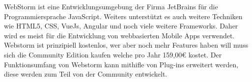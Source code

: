 WebStorm ist eine Entwicklungsumgebung der Firma JetBrains für die Programmiersprache JavaScript. Weiters unterstützt es auch weitere Techniken wie HTML5, CSS, VueJs, Angular und noch viele weitere Frameworks. Daher wird es meist für die Entwicklung von webbasierten Mobile Apps verwendet.
Webstorm ist prinzipiell kostenlos, wer aber noch mehr Features haben will muss sich die Community Edition kaufen welche pro Jahr 159,00€ kostet.
Der Funktionsumfang von Webstorm kann mithifle von Plug-ins erweitert werden, diese werden zum Teil von der Community entwickelt.

\cite{Webstorm}



